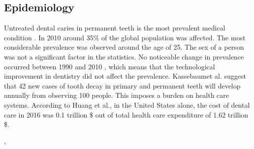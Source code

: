 \subsection{Epidemiology}
Untreated dental caries in permanent teeth is the most prevalent medical condition \cite{Kassebaum2015}. In 2010 around 35\% of the global population was affected. The most considerable prevalence was observed around the age of 25. The sex of a person was not a significant factor in the statistics. No noticeable change in prevalence occurred between 1990 and 2010 \cite{Kassebaum2015} \cite{Frencken2017}, which means that the technological improvement in dentistry did not affect the prevalence.
Kassebaumet al. suggest that 42 new cases of tooth decay in primary and permanent teeth will develop annually from observing 100 people. This imposes a burden on health care systems. According to Huang et al., \cite{Hung2020} in the United States alone, the cost of dental care in 2016 was 0.1 trillion \$ out of total health care expenditure of 1.62 trillion \$.

,